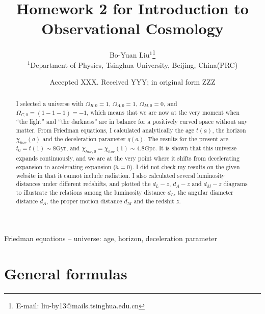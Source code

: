 \documentclass[fleqn,usenatbib]{mnras}
\title[Homework 2]{Homework 2 for Introduction to Observational Cosmology}
\author[Bo-Yuan Liu]{Bo-Yuan Liu$^{1}$\thanks{E-mail: liu-by13@mails.tsinghua.edu.cn}
\\
$^{1}$Department of Physics, Tsinghua University, Beijing, China(PRC)\\
}
\date{Accepted XXX. Received YYY; in original form ZZZ}
\begin{document}
\label{firstpage}
\pagerange{\pageref{firstpage}--\pageref{lastpage}}
\maketitle

\begin{abstract}
I selected a universe with $\Omega_{R,0}=1$, $\Omega_{\Lambda,0}=1$, $\Omega_{M,0}=0$, and $\Omega_{C,0}=(1-1-1)=-1$, which means that we are now at the very moment when ``the light'' and ``the darkness'' are in balance for a positively curved space without any matter. From Friedman equations, I calculated analytically the age $t(a)$, the horizon $\chi_{hor}(a)$ and the deceleration parameter $q(a)$. The results for the present are $t_{0}=t(1)\sim 8\mathrm{Gyr}$, and $\chi_{hor,0}=\chi_{hor}(1)\sim 4.8\mathrm{Gpc}$. It is shown that this universe expands continuously, and we are at the very point where it shifts from decelerating expansion to accelerating expansion ($\ddot{a}=0$). I did not check my results on the given website in that it cannot include radiation. I also calculated several luminosity distances under different redshifts, and plotted the $d_{L}-z$, $d_{A}-z$ and $d_{M}-z$ diagrams to illustrate the relations among the luminosity distance $d_{L}$, the angular diameter distance $d_{A}$, the proper motion distance $d_{M}$ and the redshit $z$.
\end{abstract}

\begin{keywords}
Friedman equations -- universe: age, horizon, deceleration parameter
\end{keywords}


 
\section{General formulas}



 

\label{lastpage}
\end{document}
